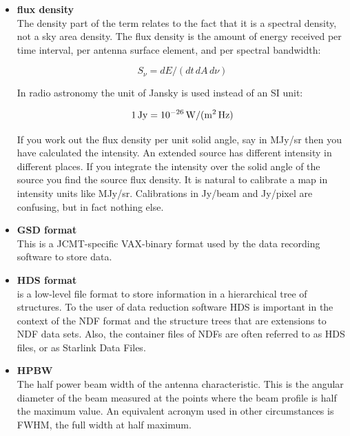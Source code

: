 \documentclass[11pt,noabs]{starlink}
\begin{document}
\begin{itemize}
\item\textbf{\label{glossflux}flux density}\\
   The density part of the
   term relates to the fact that it is a spectral density, not a sky
   area density. The flux density is the amount of energy received per
   time interval, per antenna surface element, and per spectral
   bandwidth:

\[S_{\nu} = dE / (dt\, dA\, d\nu)\]

   In radio astronomy the unit of Jansky is used instead of an SI unit:

\[1\,{\rm Jy} = 10^{-26}\,{\rm W / (m^2\, Hz)}\]

   If you work out the flux density per unit solid angle, say in
   MJy/sr then you have calculated the intensity. An extended
   source has different intensity in different places. If you integrate
   the intensity over the solid angle of the source you find the source
   flux density. It is natural to calibrate a map in intensity units
   like MJy/sr. Calibrations in Jy/beam and Jy/pixel are confusing, but
   in fact nothing else.

\item\textbf{\label{glossgsd}GSD format}\\
   This is a JCMT-specific VAX-binary
   format used by the data recording software to store data.

\item\textbf{\label{glosshds}HDS format}\\
   is a low-level file format to
   store information in a hierarchical tree of structures. To the user
   of data reduction software HDS is important in the context of the NDF
   format and the structure trees that are extensions to NDF data sets.
   Also, the container files of NDFs are often referred to as HDS files,
   or as Starlink Data Files.

\item\textbf{\label{glosshpbw}HPBW}\\
   The half power beam width of the antenna
   characteristic. This is the angular diameter of the beam measured at
   the points where the beam profile is half the maximum value. An
   equivalent acronym used in other circumstances is FWHM, the full
   width at half maximum.


\end{itemize}
\end{document}
